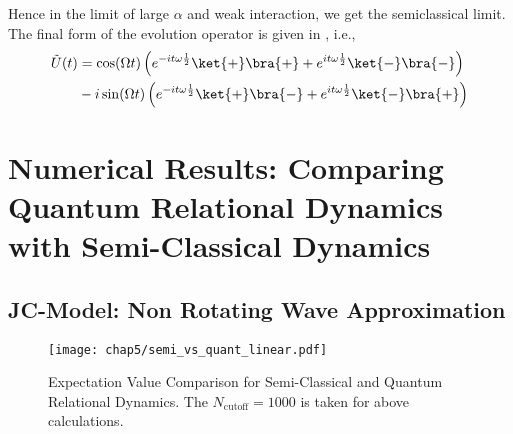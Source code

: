 Hence in the limit of large \(\alpha\) and weak interaction, we get the 
semiclassical limit. The final form of the evolution operator is given in , i.e., 
\begin{align}
    \label{eq:appen_JCM_V_g_limit2}
    \tilde{U}(t) 
    &= \cos(\Omega t) \left(e^{-i t \omega \frac{1}{2}}\ket{+}\bra{+} + 
    e^{i t \omega \frac{1}{2}}\ket{-}\bra{-} \right)  \nonumber \\
    &- i \sin(\Omega t)
     \left( e^{-i t \omega \frac{1}{2}}\ket{+}\bra{-}
    + e^{i t \omega \frac{1}{2}}\ket{-}\bra{+}\right) 
\end{align}

\section{Numerical Results: Comparing Quantum Relational Dynamics with Semi-Classical Dynamics}

\subsection*{JC-Model: Non Rotating Wave Approximation} 
\begin{figure}[!h]
    \centering
    \texttt{[image: chap5/semi\_vs\_quant\_linear.pdf]}
    \caption[Expectation Value Comparison for Semi-Classical and
     Quantum Relational Dynamics]{Expectation Value Comparison 
     for Semi-Classical and Quantum Relational Dynamics. The $N_{\mathrm{cutoff}}=1000$ is taken for above calculations.}
     \label{fig:chap5_linear_semi_vs_quant}
\end{figure}

